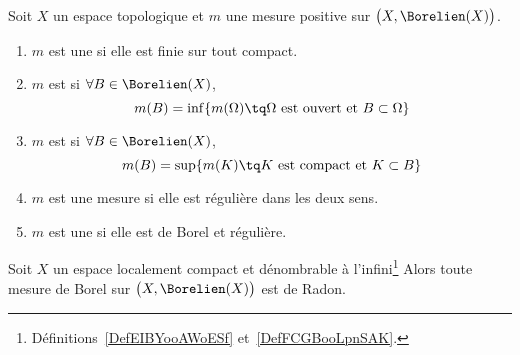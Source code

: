 \begin{definition}      \label{DefFMTEooMjbWKK}
	Soit \( X\) un espace topologique et \( m\) une mesure positive sur \( \big( X,\Borelien(X) \big)\).
	\begin{enumerate}
		\item       \label{ItemTTPTooStDcpw}
		      \( m\) est une  si elle est finie sur tout compact.
		\item
		      \( m\) est  si \( \forall B\in\Borelien(X)\),
		      \begin{equation}
			      m(B)=\inf\{ m(\Omega)\tq \Omega\text{ est ouvert et } B\subset \Omega \}
		      \end{equation}
		\item
		      \( m\) est  si \( \forall B\in\Borelien(X)\),
		      \begin{equation}
			      m(B)=\sup\{ m(K)\tq K\text{ est compact et } K\subset B  \}
		      \end{equation}
		\item
		      \( m\) est une mesure  si elle est régulière dans les deux sens.
		\item
		      \( m\) est une  si elle est de Borel et régulière.
	\end{enumerate}
\end{definition}

\begin{proposition}     \label{PropNCASooBnbFrc}
	Soit \( X\) un espace localement compact et dénombrable à l'infini\footnote{Définitions~\ref{DefEIBYooAWoESf} et~\ref{DefFCGBooLpnSAK}.} Alors toute mesure de Borel sur \( \big( X,\Borelien(X) \big)\) est de Radon.
\end{proposition}

